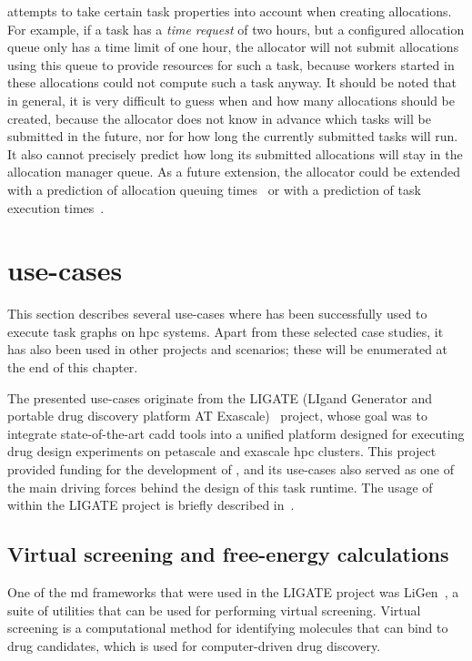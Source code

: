 \Autoalloc{} attempts to take certain task properties into account when creating
allocations. For example, if a task has a \emph{time request} of two hours, but a configured
allocation queue only has a time limit of one hour, the allocator will not submit allocations using
this queue to provide resources for such a task, because workers started in these allocations could
not compute such a task anyway. It should be noted that in general, it is very difficult to guess
when and how many allocations should be created, because the allocator does not know in advance
which tasks will be submitted in the future, nor for how long the currently submitted tasks will
run. It also cannot precisely predict how long its submitted allocations will stay in the
allocation manager queue. As a future extension, the allocator could be extended with a prediction
of allocation queuing times~\cite{allocation-duration-prediction} or with a prediction of task execution
times~\cite{task-duration-prediction}.


\section{\hyperqueue{} use-cases}
This section describes several use-cases where \hyperqueue{} has been successfully used
to execute task graphs on \gls{hpc} systems. Apart from these selected case studies,
it has also been used in other projects and scenarios; these will be enumerated at the end of this
chapter.

The presented use-cases originate from the LIGATE (LIgand Generator and portable drug discovery
platform AT Exascale)~\cite{ligate} project, whose goal was to integrate state-of-the-art
\gls{cadd} tools into a unified platform designed for executing drug design
experiments on petascale and exascale \gls{hpc} clusters. This project provided
funding for the development of \hyperqueue{}, and its use-cases also served as one of the
main driving forces behind the design of this task runtime. The usage of \hyperqueue{}
within the LIGATE project is briefly described in~\cite{ligate}.

\subsection{Virtual screening and free-energy calculations}
\label{sec:hq-usecase-ligen}
One of the \gls{md} frameworks that were used in the LIGATE project was
LiGen~\cite{ligen,ligen_exscalate}, a suite of utilities that can be used for performing virtual
screening. Virtual screening is a computational method for identifying molecules that can bind to
drug candidates, which is used for computer-driven drug discovery.

